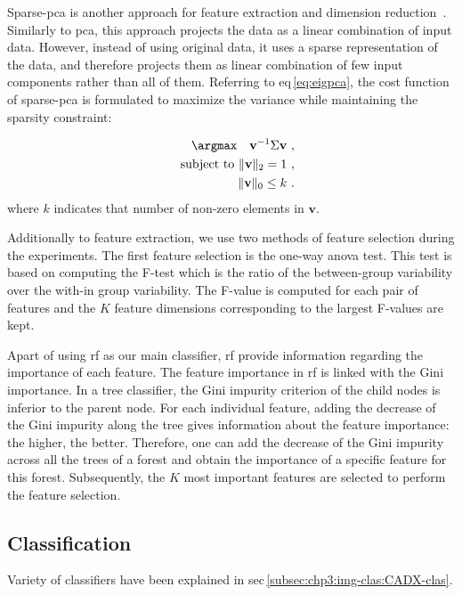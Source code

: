 Sparse-\ac{pca} is another approach for feature extraction and dimension reduction~\cite{zou2006sparse}.
Similarly to \ac{pca}, this approach projects the data as a linear combination of input data.
However, instead of using original data, it uses a sparse representation of the data, and therefore projects them as linear combination of few input components rather than all of them.
Referring to \acs{eq}\,\eqref{eq:eigpca}, the cost function of sparse-\ac{pca} is formulated to maximize the variance while maintaining the sparsity constraint:

\begin{eqnarray}
 && \argmax \quad   \mathbf{v}^{-1} \Sigma \mathbf{v}\ , \label{eq:sparsepca}\\ 
 && \text{subject to }  \Vert \mathbf{v} \Vert_{2} = 1\ , \nonumber \\
 && \Vert \mathbf{v} \Vert_{0} \leq k\ . \nonumber
\end{eqnarray}
\noindent where $k$ indicates that number of non-zero elements in $\mathbf{v}$.

Additionally to feature extraction, we use two methods of feature selection during the experiments.
The first feature selection is the one-way \ac{anova} test.
This test is based on computing the F-test which is the ratio of the between-group variability over the with-in group variability.
The F-value is computed for each pair of features and the $K$ feature dimensions corresponding to the largest F-values are kept.

Apart of using \ac{rf} as our main classifier, \ac{rf} provide information regarding the importance of each feature.
The feature importance in \ac{rf} is linked with the Gini importance.
In a tree classifier, the Gini impurity criterion of the child nodes is inferior to the parent node.
For each individual feature, adding the decrease of the Gini impurity along the tree gives information about the feature importance: the higher, the better.
Therefore, one can add the decrease of the Gini impurity across all the trees of a forest and obtain the importance of a specific feature for this forest.
Subsequently, the $K$ most important features are selected to perform the feature selection.

\subsection{Classification}\label{subsec:chp6:method:clas}
Variety of classifiers have been explained in \acs{sec}\,\ref{subsec:chp3:img-clas:CADX-clas}. 

